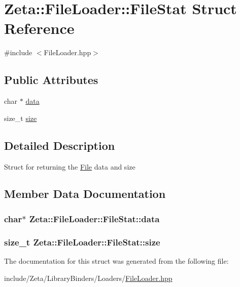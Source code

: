 \hypertarget{structZeta_1_1FileLoader_1_1FileStat}{\section{Zeta\+:\+:File\+Loader\+:\+:File\+Stat Struct Reference}
\label{structZeta_1_1FileLoader_1_1FileStat}
}


{\ttfamily \#include $<$File\+Loader.\+hpp$>$}

\subsection*{Public Attributes}
\begin{DoxyCompactItemize}
\item 
char $\ast$ \hyperlink{structZeta_1_1FileLoader_1_1FileStat_ae5ffa8222df3d49b3ab4df4a9c50500d}{data}
\item 
size\+\_\+t \hyperlink{structZeta_1_1FileLoader_1_1FileStat_a5ac4888bac398526841df314bc883955}{size}
\end{DoxyCompactItemize}


\subsection{Detailed Description}
Struct for returning the \hyperlink{classZeta_1_1File}{File} data and size 

\subsection{Member Data Documentation}
\hypertarget{structZeta_1_1FileLoader_1_1FileStat_ae5ffa8222df3d49b3ab4df4a9c50500d}{
\subsubsection[{data}]{\setlength{\rightskip}{0pt plus 5cm}char$\ast$ Zeta\+::\+File\+Loader\+::\+File\+Stat\+::data}}\label{structZeta_1_1FileLoader_1_1FileStat_ae5ffa8222df3d49b3ab4df4a9c50500d}
\hypertarget{structZeta_1_1FileLoader_1_1FileStat_a5ac4888bac398526841df314bc883955}{
\subsubsection[{size}]{\setlength{\rightskip}{0pt plus 5cm}size\+\_\+t Zeta\+::\+File\+Loader\+::\+File\+Stat\+::size}}\label{structZeta_1_1FileLoader_1_1FileStat_a5ac4888bac398526841df314bc883955}


The documentation for this struct was generated from the following file\+:\begin{DoxyCompactItemize}
\item 
include/\+Zeta/\+Library\+Binders/\+Loaders/\hyperlink{FileLoader_8hpp}{File\+Loader.\+hpp}\end{DoxyCompactItemize}
